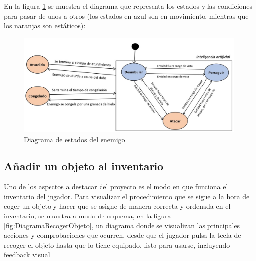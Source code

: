 En la figura \ref{fig:DiagramaEnemigo} se muestra el diagrama que representa los estados y las condiciones para pasar de unos a otros (los estados en azul son en movimiento, mientras que los naranjas son estáticos):

\begin{figure}[h]
    \centering
    \includegraphics[scale=0.45]{img/EnemyStates.jpg}
    \caption{Diagrama de estados del enemigo}
    \label{fig:DiagramaEnemigo}
    \end{figure}
    
\subsection{Añadir un objeto al inventario}
Uno de los aspectos a destacar del proyecto es el modo en que funciona el inventario del jugador. Para visualizar el procedimiento que se sigue a la hora de coger un objeto y hacer que se asigne de manera correcta y ordenada en el inventario, se muestra a modo de esquema, en la figura \ref{fig:DiagramaRecogerObjeto}, un diagrama donde se visualizan las principales acciones y comprobaciones que ocurren, desde que el jugador pulsa la tecla de recoger el objeto hasta que lo tiene equipado, listo para usarse, incluyendo feedback visual.

